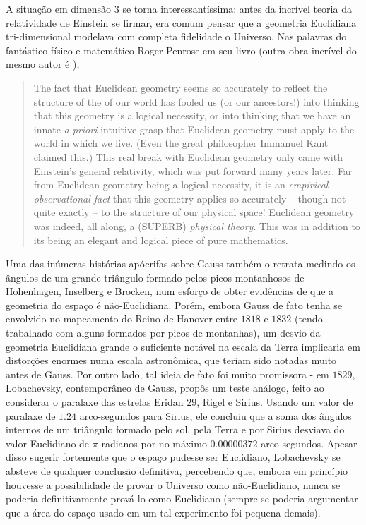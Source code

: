  \par 
A situação em dimensão $3$ se torna interessantíssima: antes da incrível teoria da relatividade de Einstein se firmar, era comum pensar que a geometria Euclidiana tri-dimensional modelava com completa fidelidade o Universo. Nas palavras do fantástico físico e matemático Roger Penrose em seu livro  (outra obra incrível do mesmo autor é ),
\blockquote{The fact that Euclidean geometry seems so accurately to reflect the structure of the  of our world has fooled us (or our ancestors!) into thinking that this geometry is a logical necessity, or into thinking that we have an innate \emph{a priori} intuitive grasp that Euclidean geometry must apply to the world in which we live. (Even the great philosopher Immanuel Kant claimed this.) This real break with Euclidean geometry only came with Einstein's general relativity, which was put forward many years later. Far from Euclidean geometry being a logical necessity, it is an \emph{empirical observational fact} that this geometry applies so accurately -- though not quite exactly -- to the structure of our physical space! Euclidean geometry was indeed, all along, a (SUPERB) \emph{physical theory}. This was in addition to its being an elegant and logical piece of pure mathematics.}
Uma das inúmeras histórias apócrifas sobre Gauss também o retrata medindo os ângulos de um grande triângulo formado pelos picos montanhosos de Hohenhagen, Inselberg e Brocken, num esforço de obter evidências de que a geometria do espaço é não-Euclidiana. Porém, embora Gauss de fato tenha se envolvido no mapeamento do Reino de Hanover entre $1818$ e $1832$ (tendo trabalhado com alguns  formados por picos de montanhas), um desvio da geometria Euclidiana grande o suficiente notável na escala da Terra implicaria em distorções enormes numa escala astronômica, que teriam sido notadas muito antes de Gauss. Por outro lado, tal ideia de fato foi muito promissora - em $1829$, Lobachevsky, contemporâneo de Gauss, propôs um teste análogo, feito ao considerar o paralaxe das estrelas Eridan $29$, Rigel e Sirius. Usando um valor de paralaxe de $1.24$ arco-segundos para Sirius, ele concluiu que a soma dos ângulos internos de um triângulo formado pelo sol, pela Terra e por Sirius desviava do valor Euclidiano de $\pi$ radianos por no máximo $0.00000372$ arco-segundos. Apesar disso sugerir fortemente que o espaço pudesse ser Euclidiano, Lobachevsky se absteve de qualquer conclusão definitiva, percebendo que, embora em princípio houvesse a possibilidade de provar o Universo como não-Euclidiano, nunca se poderia definitivamente prová-lo como Euclidiano (sempre se poderia argumentar que a área do espaço usado em um tal experimento foi pequena demais). \par 
